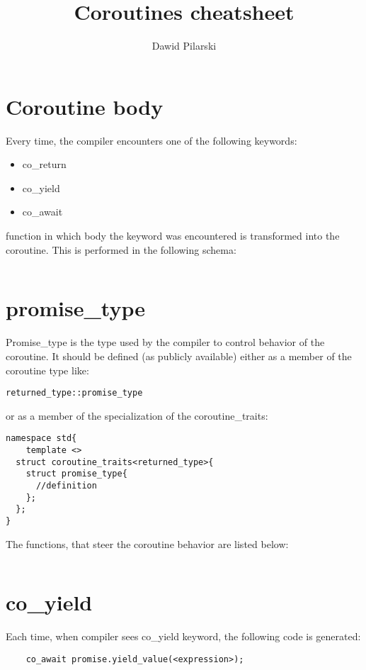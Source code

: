 \documentclass[twoside,twocolumn, 10pt]{article}
\author{Dawid Pilarski}
\date{}
\title{Coroutines cheatsheet}
\begin{document}
\section{Coroutine body}

Every time, the compiler encounters one of the following
keywords:
\begin{itemize}
	\item co\_return
	\item co\_yield
	\item co\_await
\end{itemize}

function in which body the keyword was encountered is transformed into
the coroutine. This is performed in the following schema:

\inputminted{c++}{code-examples/theory-custom-coroutine/coroutine-body.cpp}

\section{promise\_type}

Promise\_type is the type used by the compiler to control behavior of the coroutine.
It should be defined (as publicly available) either as a member of the coroutine type like:

\begin{verbatim}
returned_type::promise_type
\end{verbatim}

or as a member of the specialization of the coroutine\_traits:

\begin{verbatim}
namespace std{
	template <>
  struct coroutine_traits<returned_type>{
    struct promise_type{
      //definition
    };
  };
}
\end{verbatim}

The functions, that steer the coroutine behavior are listed below:

\inputminted{c++}{code-examples/theory-custom-coroutine/promise-type.hpp}

\section{co\_yield}
	Each time, when compiler sees co\_yield keyword, the following
	code is generated:

\begin{verbatim}
	co_await promise.yield_value(<expression>);
\end{verbatim}
\end{document}
